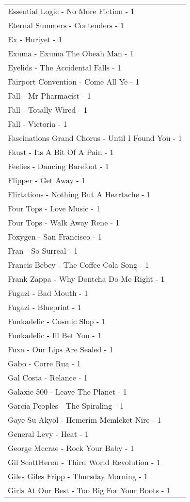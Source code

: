 \documentclass[
]{article}
\begin{document}
\begin{longtable}{l}
Essential Logic - No More Fiction - 1 \\ 
Eternal Summers - Contenders - 1 \\ 
Ex - Huriyet - 1 \\ 
Exuma - Exuma The Obeah Man - 1 \\ 
Eyelids - The Accidental Falls - 1 \\ 
Fairport Convention - Come All Ye - 1 \\ 
Fall - Mr Pharmacist - 1 \\ 
Fall - Totally Wired - 1 \\ 
Fall - Victoria - 1 \\ 
Fascinations Grand Chorus - Until I Found You - 1 \\ 
Faust - Its A Bit Of A Pain - 1 \\ 
Feelies - Dancing Barefoot - 1 \\ 
Flipper - Get Away - 1 \\ 
Flirtations - Nothing But A Heartache - 1 \\ 
Four Tops - Love Music - 1 \\ 
Four Tops - Walk Away Rene - 1 \\ 
Foxygen - San Francisco - 1 \\ 
Fran - So Surreal - 1 \\ 
Francis Bebey - The Coffee Cola Song - 1 \\ 
Frank Zappa - Why Dontcha Do Me Right - 1 \\ 
Fugazi - Bad Mouth - 1 \\ 
Fugazi - Blueprint - 1 \\ 
Funkadelic - Cosmic Slop - 1 \\ 
Funkadelic - Ill Bet You - 1 \\ 
Fuxa - Our Lips Are Sealed - 1 \\ 
Gabo - Corre Rua - 1 \\ 
Gal Costa - Relance - 1 \\ 
Galaxie 500 - Leave The Planet - 1 \\ 
Garcia Peoples - The Spiraling - 1 \\ 
Gaye Su Akyol - Hemerim Memleket Nire - 1 \\ 
General Levy - Heat - 1 \\ 
George Mccrae - Rock Your Baby - 1 \\ 
Gil ScottHeron - Third World Revolution - 1 \\ 
Giles Giles Fripp - Thursday Morning - 1 \\ 
Girls At Our Best - Too Big For Your Boots - 1 \\ 

\end{longtable}
\end{document}
